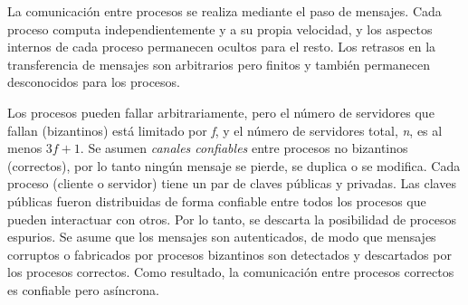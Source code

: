 La comunicación entre procesos se realiza mediante el paso de mensajes.
Cada proceso computa independientemente y a su propia velocidad, y los aspectos internos de cada proceso
permanecen ocultos para el resto. Los retrasos en la transferencia de mensajes son arbitrarios pero finitos
y también permanecen desconocidos para los procesos.

Los procesos pueden fallar arbitrariamente, pero el número de servidores que fallan (bizantinos) está
limitado por \textit{f}, y el número de servidores total, \textit{n}, es al menos $3f + 1$.
Se asumen \textit{canales confiables} entre procesos no bizantinos (correctos), por lo tanto ningún
mensaje se pierde, se duplica o se modifica.
Cada proceso (cliente o servidor) tiene un par de claves públicas y privadas.
Las claves públicas fueron distribuidas de forma confiable entre todos los procesos que pueden interactuar
con otros.
Por lo tanto, se descarta la posibilidad de procesos espurios.
Se asume que los mensajes son autenticados, de modo que mensajes corruptos o fabricados por
procesos bizantinos son detectados y descartados por los procesos correctos.
Como resultado, la comunicación entre procesos correctos es confiable pero asíncrona.

